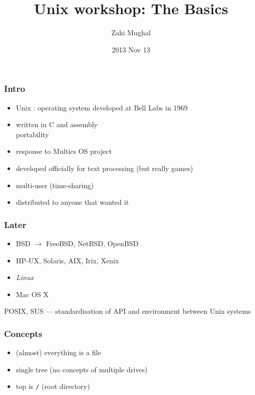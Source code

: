\documentclass[%
        hyperref={%
                pdfauthor={Zakariyya Mughal},%
                pdfpagemode={None},pdfpagelayout={SinglePage}}%
        xcolor={x11names},%
]{beamer}
\title[Unix Basics]{Unix workshop: The Basics}
\author{Zaki Mughal}
\institute{Computational Biomedicine Lab\\University of Houston}
\date{2013 Nov 13}
\begin{document}
\frame{\titlepage}

\begin{frame}
	\frametitle{Intro}
	\begin{itemize}
		\item Unix : operating system developed at Bell
			Labs in 1969
		\pause\item written in C and assembly \\
			\pause \qquad portability
		\pause\item response to Multics OS project
		\pause \item developed officially for text processing \pause (but
			really games)
		\pause \item multi-user (time-sharing)
		\pause \item distributed to anyone that wanted it
	\end{itemize}
\end{frame}

\begin{frame}
	\frametitle{Later}
	\begin{itemize}
		\item BSD $\rightarrow$ FreeBSD, NetBSD, OpenBSD
		\pause \item HP-UX, Solaris, AIX, Irix, Xenix
		\pause \item \emph{Linux}
		\pause \item Mac OS X
	\end{itemize}

	\pause POSIX, SUS --- standardisation of API and environment between
	Unix systems
\end{frame}

\begin{frame}
	\frametitle{Concepts}
	\begin{itemize}
		\item (almost) everything is a file
		\item single tree (no concepts of multiple drives)
		\item top is \texttt{/} (root directory)
	\end{itemize}
\end{frame}
\end{document}
